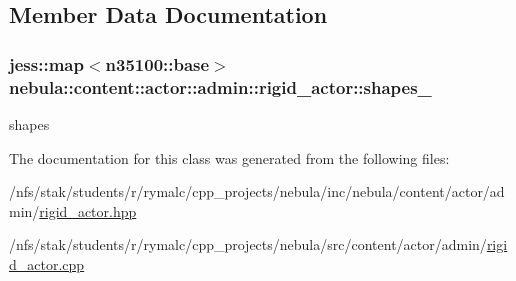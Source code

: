 \subsection{Member Data Documentation}
\hypertarget{classnebula_1_1content_1_1actor_1_1admin_1_1rigid__actor_a979687ddafce2487456fe15f67befb8b}{
\subsubsection[{shapes\_\-}]{\setlength{\rightskip}{0pt plus 5cm}jess::map$<${\bf n35100::base}$>$ {\bf nebula::content::actor::admin::rigid\_\-actor::shapes\_\-}}}
\label{classnebula_1_1content_1_1actor_1_1admin_1_1rigid__actor_a979687ddafce2487456fe15f67befb8b}


shapes 

The documentation for this class was generated from the following files:\begin{DoxyCompactItemize}
\item 
/nfs/stak/students/r/rymalc/cpp\_\-projects/nebula/inc/nebula/content/actor/admin/\hyperlink{admin_2rigid__actor_8hpp}{rigid\_\-actor.hpp}\item 
/nfs/stak/students/r/rymalc/cpp\_\-projects/nebula/src/content/actor/admin/\hyperlink{admin_2rigid__actor_8cpp}{rigid\_\-actor.cpp}\end{DoxyCompactItemize}
